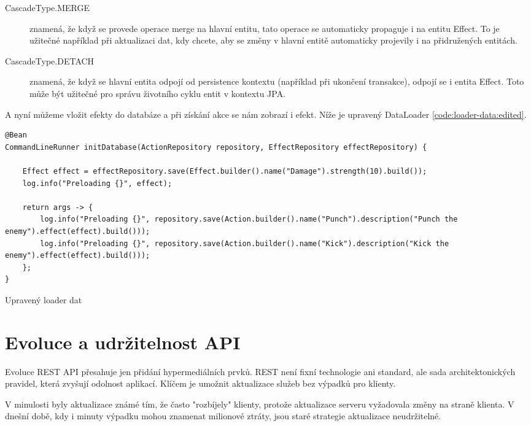 \begin{description}
    \item[CascadeType.MERGE] znamená, že když se provede operace merge na hlavní entitu, tato operace se automaticky propaguje i na entitu Effect. To je užitečné například při aktualizaci dat, kdy chcete, aby se změny v hlavní entitě automaticky projevily i na přidružených entitách.
    \item[CascadeType.DETACH] znamená, že když se hlavní entita odpojí od persistence kontextu (například při ukončení transakce), odpojí se i entita Effect. Toto může být užitečné pro správu životního cyklu entit v kontextu JPA.
\end{description}

A nyní můžeme vložit efekty do databáze a při získání akce se nám zobrazí i efekt. Níže je upravený DataLoader \ref{code:loader-data:edited}.

\begin{listing}[H]
    \begin{verbatim}
@Bean
CommandLineRunner initDatabase(ActionRepository repository, EffectRepository effectRepository) {

    Effect effect = effectRepository.save(Effect.builder().name("Damage").strength(10).build());
    log.info("Preloading {}", effect);

    return args -> {
        log.info("Preloading {}", repository.save(Action.builder().name("Punch").description("Punch the enemy").effect(effect).build()));
        log.info("Preloading {}", repository.save(Action.builder().name("Kick").description("Kick the enemy").effect(effect).build()));
    };
}
    \end{verbatim}
    \caption{Upravený loader dat}
    \label{code:loader-data:edited}
\end{listing}



\section{Evoluce a udržitelnost API}

Evoluce REST API přesahuje jen přidání hypermediálních prvků. REST není fixní technologie ani standard, ale sada architektonických pravidel, která zvyšují odolnost aplikací. Klíčem je umožnit aktualizace služeb bez výpadků pro klienty.

V minulosti byly aktualizace známé tím, že často "rozbíjely" klienty, protože aktualizace serveru vyžadovala změny na straně klienta. V dnešní době, kdy i minuty výpadku mohou znamenat milionové ztráty, jsou staré strategie aktualizace neudržitelné.

